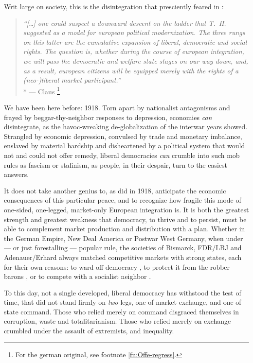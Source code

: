 Writ large on society, this is the disintegration that \citeauthor{Offe1998} presciently feared in \citeyear{Offe1998}:
\begin{quote}
	\emph{``[\ldots] one could suspect a downward descent on the ladder that T.~H.~\cite{Marshall-1950-aa} suggested as a model for european political modernization.
	The three rungs on this latter are the cumulative expansion of liberal, democratic and social rights.
	The question is, whether during the course of european integration, we will pass the democratic and welfare state stages on our way down, and, as a result, european citizens will be equipped merely with the rights of a (neo-)liberal market participant.''}
	\\*
	--- Claus \citet[41]{Offe1998}
	\footnote{
		For the german original, see footnote \ref{fn:Offe-regress}.
	}
\end{quote}

We have been here before:
1918.
Torn apart by nationalist antagonisms and frayed by beggar-thy-neighbor responses to depression, economies \emph{can} disintegrate, as the havoc-wreaking de-globalization of the interwar years showed.
Strangled by economic depression, convulsed by trade and monetary imbalance, enslaved by material hardship and disheartened by a political system that would not and could not offer remedy, liberal democracies \emph{can} crumble into such mob rules as fascism or stalinism, as people, in their despair, turn to the easiest answers.

It does not take another genius to, as \cite{Keynes1936} did in 1918, anticipate the economic consequences of this particular peace, and to recognize how fragile this mode of one-sided, one-legged, market-only European integration is.
It is both the greatest strength and greatest weakness that democracy, to thrive and to persist, must be able to complement market production and distribution with a plan.
Whether in the German Empire, New Deal America or  Postwar West Germany, when under --- or just forestalling --- popular rule, the societies of Bismarck, FDR/LBJ and Adenauer/Erhard always matched competitive markets with strong states, each for their own reasons:
to ward off democracy \citep{Leibfried}, to protect it from the robber barons \citep{Wapshott2011}, or to compete with a socialist neighbor \citep{Judt2006}.

To this day, not a single developed, liberal democracy has withstood the test of time, that did not stand firmly on \emph{two} legs, one of market exchange, and one of state command.
Those who relied merely on command disgraced themselves in corruption, waste and totalitarianism.
Those who relied merely on exchange crumbled under the assault of extremists, and inequality.

